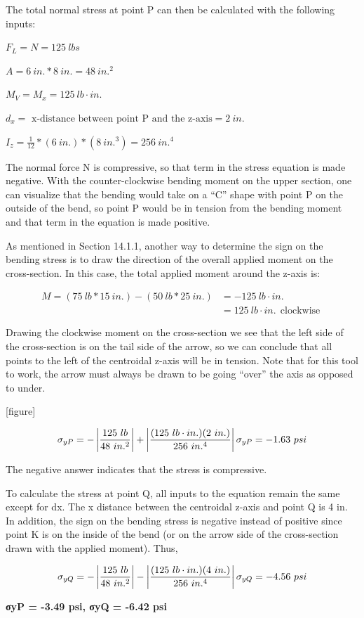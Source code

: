 \documentclass[
  letterpaper,
  DIV=11,
  numbers=noendperiod]{scrreprt}
\theoremstyle{definition}
\theoremstyle{remark}
\begin{document}
\begin{tcolorbox}
\begin{tcolorbox}
The total normal stress at point P can then be calculated with the
following inputs:

\(F_L = N = 125{~lbs}\)

\(A = 6{~in.}*8{~in.} = 48{~in.^2}\)

\(M_V = M_x = 125{~lb}\cdot{in.}\)

\(d_x =\text{ x-distance between point P and the z-axis} = 2{~in.}\)

\(I_z = \frac{1}{12}*(6{~in.})*(8{~in.^3}) = 256{~in.^4}\)

The normal force N is compressive, so that term in the stress equation
is made negative. With the counter-clockwise bending moment on the upper
section, one can visualize that the bending would take on a ``C'' shape
with point P on the outside of the bend, so point P would be in tension
from the bending moment and that term in the equation is made positive.

As mentioned in Section 14.1.1, another way to determine the sign on the
bending stress is to draw the direction of the overall applied moment on
the cross-section. In this case, the total applied moment around the
z-axis is:

\[
\begin{aligned}
M=(75{~lb}*15{~in.})-(50{~lb}*25{~in.})&=-125{~lb}\cdot{in.} \\
&=125{~lb}\cdot{in.}~~\text{clockwise }
\end{aligned}
\]

Drawing the clockwise moment on the cross-section we see that the left
side of the cross-section is on the tail side of the arrow, so we can
conclude that all points to the left of the centroidal z-axis will be in
tension. Note that for this tool to work, the arrow must always be drawn
to be going ``over'' the axis as opposed to under.

{[}figure{]}

\[
\sigma_{yP}=-\left|\frac{125{~lb}}{48{~in.^2}}\right|+\left|\frac{(125{~lb}\cdot{in.})(2{~in.})}{256{~in.^4}}\right| \\
\sigma_{yP}=-1.63{~psi}
\]

The negative answer indicates that the stress is compressive.

To calculate the stress at point Q, all inputs to the equation remain
the same except for dx. The x distance between the centroidal z-axis and
point Q is 4 in. In addition, the sign on the bending stress is negative
instead of positive since point K is on the inside of the bend (or on
the arrow side of the cross-section drawn with the applied moment).
Thus,

\[
\sigma_{yQ}=-\left|\frac{125{~lb}}{48{~in.^2}}\right|-\left|\frac{(125{~lb}\cdot{in.})(4{~in.})}{256{~in.^4}}\right| \\
\sigma_{yQ}=-4.56{~psi}
\]

\textbf{σyP = -3.49 psi, σyQ = -6.42 psi}

\end{tcolorbox}

\end{tcolorbox}
\end{document}
